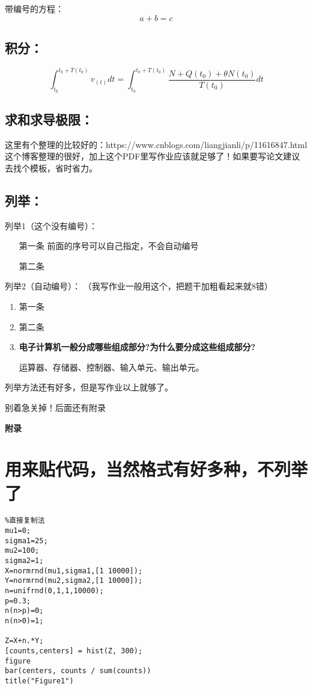 \documentclass[UTF8]{ctexart}
\begin{document}
带编号的方程：
\begin{equation}
a+b=c
\end{equation}
\subsection{积分：} 
$$\displaystyle{\int_{t_0}^{t_0+T(t_0)}} v_{(t)}dt = \displaystyle {\int_{t_0}^{t_0+T(t_0)}} \dfrac{N+Q(t_0)+ \theta N(t_0)}{T(t_0)}dt$$
\subsection{求和求导极限：} 
这里有个整理的比较好的：https://www.cnblogs.com/liangjianli/p/11616847.html
这个博客整理的很好，加上这个PDF里写作业应该就足够了！如果要写论文建议去找个模板，省时省力。
\subsection{列举：} 
列举1（这个没有编号）：
\begin{enumerate}
\item[第一条]前面的序号可以自己指定，不会自动编号
\item[第二条]
\end{enumerate}

列举2（自动编号）：
（我写作业一般用这个，把题干加粗看起来就8错）
\begin{enumerate}
\item 第一条
\item 第二条
\item \textbf{电子计算机一般分成哪些组成部分?为什么要分成这些组成部分?}

运算器、存储器、控制器、输入单元、输出单元。

\end{enumerate}

列举方法还有好多，但是写作业以上就够了。

别着急关掉！后面还有附录

\newpage
\appendix
\textbf{附录}

\section{用来贴代码，当然格式有好多种，不列举了}
\begin{lstlisting}
%直接复制法
mu1=0;
sigma1=25;
mu2=100;
sigma2=1;
X=normrnd(mu1,sigma1,[1 10000]);
Y=normrnd(mu2,sigma2,[1 10000]);
n=unifrnd(0,1,1,10000);
p=0.3;
n(n>p)=0;
n(n>0)=1;

Z=X+n.*Y;
[counts,centers] = hist(Z, 300);
figure
bar(centers, counts / sum(counts))
title("Figure1")
\end{lstlisting}
\end{document}
